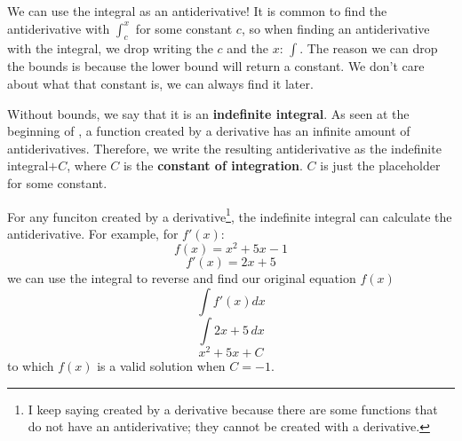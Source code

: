 \documentclass[../revisedmain.tex]{subfiles}
\begin{document}
We can use the integral as an antiderivative! It is common to find the antiderivative with $\int_{c}^{x}$ for some constant $c$, so when finding an antiderivative with the integral, we drop writing the $c$ and the $x$: $\int$. The reason we can drop the bounds is because the lower bound will return a constant. We don't care about what that constant is, we can always find it later. \\\par Without bounds, we say that it is an \textbf{indefinite integral}. As seen at the beginning of , a function created by a derivative has an infinite amount of antiderivatives. Therefore, we write the resulting antiderivative as the indefinite integral$+C$, where $C$ is the \textbf{constant of integration}. $C$ is just the placeholder for some constant.\\\par For any funciton created by a derivative\footnote{I keep saying created by a derivative because there are some functions that do not have an antiderivative; they cannot be created with a derivative.}, the indefinite integral can calculate the antiderivative. For example, for $f'(x)$:$$f(x)=x^2+5x-1$$$$f'(x)=2x+5$$we can use the integral to reverse and find our original equation $f(x)$$$\int f'(x)dx$$$$\int 2x+5\,dx$$$$x^2+5x+C$$to which $f(x)$ is a valid solution when $C=-1$.\\
\end{document}
